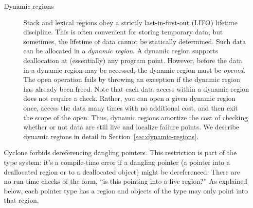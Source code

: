 \begin{description}
\item[Dynamic regions] Stack and lexical regions obey a strictly
  last-in-first-out (LIFO) lifetime discipline.  This is often
  convenient for storing temporary data, but sometimes, the lifetime
  of data cannot be statically determined.  Such data can be allocated
  in a \emph{dynamic region}.  A dynamic region supports deallocation
  at (essentially) any program point.  However, before the data in a
  dynamic region may be accessed, the dynamic region must be
  \emph{opened}.  The open operation fails by throwing an exception if
  the dynamic region has already been freed.  Note that each data
  access within a dynamic region does not require a check.  Rather,
  you can open a given dynamic region once, access the data many times
  with no additional cost, and then exit the scope of the open.  Thus,
  dynamic regions amortize the cost of checking whether or not data
  are still live and localize failure points. We describe dynamic
  regions in detail in Section~\ref{sec:dynamic-regions}.

 \end{description}

Cyclone forbids dereferencing dangling pointers.  This restriction is part of
the type system: it's a compile-time error if a dangling pointer (a pointer
into a deallocated region or to a deallocated object) might be dereferenced.
There are no run-time checks of the form, ``is this pointing into a live
region?''  As explained below, each pointer type has a region and objects of
the type may only point into that region.

